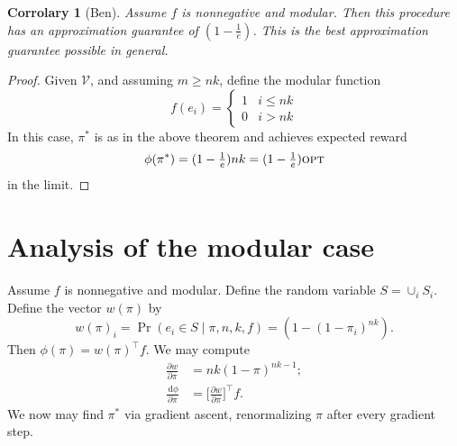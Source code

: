 \documentclass{article}
\newcommand{\given}{\mid}
\newcommand{\cm}[1]{\mathcal{#1}}
\newcommand{\trans}{^{\top}}
\newcommand{\intd}[1]{\, \mathrm{d}#1}
\newcommand{\acro}[1]{\textsc{\MakeLowercase{#1}}}
\newtheorem{cor}{Corrolary}
\begin{document}
\begin{cor}[Ben]{Assume $f$ is nonnegative and modular. Then
    this procedure has an approximation guarantee of $(1 -
    \frac{1}{e})$.  This is the best approximation guarantee
    possible in general.}
\end{cor}
\begin{proof}
  Given $\cm{V}$, and assuming $m \geq nk$, define the modular
  function
  \[
    f(e_i) =
    \begin{cases}
      1 & i \leq nk \\
      0 & i > nk
    \end{cases}
  \]
  In this case, $\pi^\ast$ is as in the above theorem and achieves
  expected reward
  \[
    \phi(\pi^\ast) =
    (1 - \tfrac{1}{e})nk =
    (1 - \tfrac{1}{e})\text{\acro{OPT}}
  \]
  in the limit.
\end{proof}

\section*{Analysis of the modular case}

Assume $f$ is nonnegative and modular.  Define the random variable $S
= \cup_i S_i$.  Define the vector $w(\pi)$ by
\[
  w(\pi)_i
  = \Pr(e_i \in S \given \pi, n, k, f)
  = (1 - (1 - \pi_i)^{nk}).
\]
Then $\phi(\pi) = w(\pi)\trans f$. We may compute
\begin{align*}
  \frac{\partial w}{\partial \pi}
  &=
  nk(1 - \pi)^{nk - 1}; \\
  \frac{\intd{\phi}}{\partial \pi}
  &=
  \Biggl[\frac{\partial w}{\partial \pi}\Biggr]\trans f.
\end{align*}
We now may find $\pi^\ast$ via gradient ascent, renormalizing $\pi$
after every gradient step.
\end{document}
